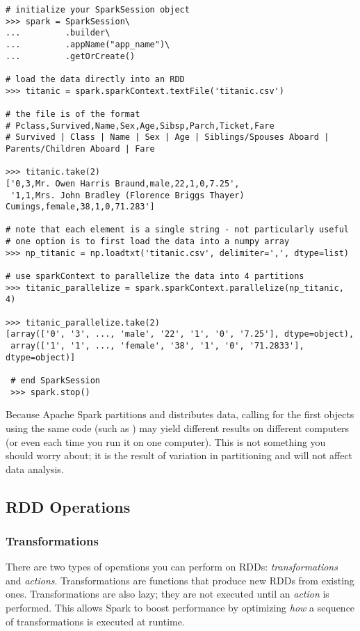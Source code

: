 \begin{lstlisting}
# initialize your SparkSession object
>>> spark = SparkSession\
...         .builder\
...         .appName("app_name")\
...         .getOrCreate()

# load the data directly into an RDD
>>> titanic = spark.sparkContext.textFile('titanic.csv')

# the file is of the format
# Pclass,Survived,Name,Sex,Age,Sibsp,Parch,Ticket,Fare
# Survived | Class | Name | Sex | Age | Siblings/Spouses Aboard | Parents/Children Aboard | Fare

>>> titanic.take(2)
['0,3,Mr. Owen Harris Braund,male,22,1,0,7.25',
 '1,1,Mrs. John Bradley (Florence Briggs Thayer) Cumings,female,38,1,0,71.283']

# note that each element is a single string - not particularly useful
# one option is to first load the data into a numpy array
>>> np_titanic = np.loadtxt('titanic.csv', delimiter=',', dtype=list)

# use sparkContext to parallelize the data into 4 partitions
>>> titanic_parallelize = spark.sparkContext.parallelize(np_titanic, 4)

>>> titanic_parallelize.take(2)
[array(['0', '3', ..., 'male', '22', '1', '0', '7.25'], dtype=object),
 array(['1', '1', ..., 'female', '38', '1', '0', '71.2833'], dtype=object)]
 
 # end SparkSession
 >>> spark.stop()
\end{lstlisting}

\begin{warn}
Because Apache Spark partitions and distributes data, calling for the first  objects using the same code (such as ) may yield different results on different computers (or even each time you run it on one computer). 
This is not something you should worry about; it is the result of variation in partitioning and will not affect data analysis.
\end{warn}

\subsection*{RDD Operations}
\subsubsection*{Transformations}
There are two types of operations you can perform on RDDs: \textit{transformations} and \textit{actions}.
Transformations are functions that produce new RDDs from existing ones.
Transformations are also lazy; they are not executed until an \textit{action} is performed.
This allows Spark to boost performance by optimizing \textit{how} a sequence of transformations is executed at runtime.

